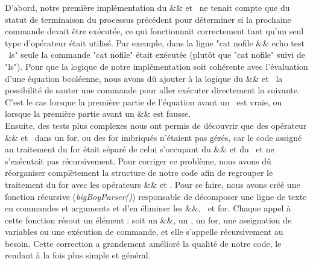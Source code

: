 \documentclass{article}
\begin{document}
\setlength{\parindent}{20pt}  
D’abord, notre première implémentation du \&\& et \textbar\textbar~ne tenait compte que du statut de terminaison du processus précédent pour déterminer si la prochaine commande devait être exécutée, ce qui fonctionnait correctement tant qu’un seul type d'opérateur était utilisé. Par exemple, dans la ligne "cat nofile \&\& echo test \textbar\textbar~ls" seule la commande "cat nofile" était exécutée (plutôt que "cat nofile" suivi de "ls").  Pour que la logique de notre implémentation soit cohérente avec l’évaluation d’une équation booléenne, nous avons dû ajouter à la logique du \&\& et \textbar\textbar~la possibilité de sauter une commande pour aller exécuter directement la suivante. C’est le cas lorsque la première partie de l’équation avant un \textbar\textbar~est vraie, ou lorsque la première partie avant un \&\& est fausse.
\\

\setlength{\parindent}{20pt}
Ensuite, des tests plus complexes nous ont permis de découvrir que des opérateur \&\& et \textbar\textbar~dans un for, ou des for imbriqués n'étaient pas gérés, car le code assigné au traitement du for était séparé de celui s'occupant du \&\& et du \textbar\textbar~et ne s’exécutait pas récursivement. Pour corriger ce problème, nous avons dû réorganiser complètement la structure de notre code afin de regrouper le traitement du for avec les opérateurs \&\& et \textbar\textbar. Pour se faire, nous avons créé une fonction récursive (\emph{bigBoyParser()}) responsable de décomposer une ligne de texte en commandes et arguments et d’en éliminer les \&\&, \textbar\textbar~et for. Chaque appel à cette fonction résout un élément : soit un \&\&, un \textbar\textbar, un for, une assignation de variables ou une exécution de commande, et elle s’appelle récursivement au besoin. Cette correction a grandement amélioré la qualité de notre code, le rendant à la fois plus simple et général. 
\end{document}
